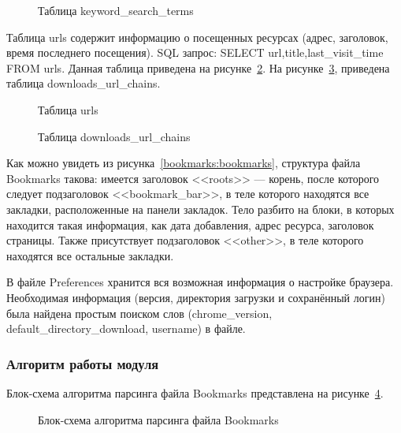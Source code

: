 \begin{figure}[ht]
\caption{Таблица keyword\_search\_terms}
\label{key:key}
\end{figure}

Таблица  urls содержит информацию о посещенных ресурсах (адрес, заголовок, время последнего посещения). SQL запрос: SELECT url,title,last\_visit\_time FROM urls. Данная таблица приведена на рисунке~\ref{urls:urls}. На рисунке~\ref{chains:chains}, приведена таблица downloads\_url\_chains.

\begin{figure}[h!]
\caption{Таблица urls}
\label{urls:urls}
\end{figure}

\begin{figure}[h!]
\caption{Таблица downloads\_url\_chains}
\label{chains:chains}
\end{figure}

Как можно увидеть из рисунка~\ref{bookmarks:bookmarks}, структура файла Bookmarks такова: имеется заголовок <<roots>> --- корень, после которого следует подзаголовок <<bookmark\_bar>>, в  теле которого находятся все закладки, расположенные на панели закладок. Тело разбито на блоки, в которых находится такая информация, как дата добавления, адрес ресурса, заголовок страницы. Также присутствует подзаголовок <<other>>, в теле которого находятся все остальные закладки.



В файле Preferences хранится вся возможная информация о настройке браузера. Необходимая информация (версия,  директория загрузки и сохранённый логин) была найдена простым поиском слов (chrome\_version, default\_directory\_download, username) в файле.

\subsubsection{Алгоритм работы модуля}


Блок-схема алгоритма парсинга файла Bookmarks представлена на рисунке~\ref{bookmarks_parsing:bookmarks_parsing}.
\begin{figure}[h]
\caption{Блок-схема алгоритма парсинга файла Bookmarks}
\label{bookmarks_parsing:bookmarks_parsing}
\end{figure}



